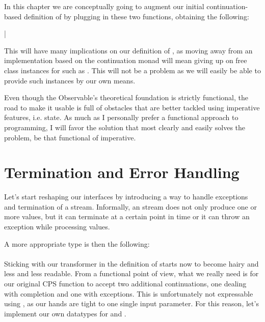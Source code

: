 In this chapter we are conceptually going to augment our initial continuation-based definition of  by plugging in these two functions, obtaining the following:

\hmint |%

This will have many implications on our definition of , as moving away from an implementation based on the continuation monad will mean giving up on free class instances for  such as . This will not be a problem as we will easily be able to provide such instances by our own means. 

Even though the Observable's theoretical foundation is strictly functional, the road to make it usable is full of obstacles that are better tackled using imperative features, i.e. state. As much as I personally prefer a functional approach to programming, I will favor the solution that most clearly and easily solves the problem, be that functional of imperative.

\section{Termination and Error Handling}

Let's start reshaping our interfaces by introducing a way to handle exceptions and termination of a stream. Informally, an  stream does not only produce one or more values, but it can terminate at a certain point in time or it can throw an exception while processing values.

A more appropriate type is then the following:\\

\\

Sticking with our  transformer in the definition of  starts now to become hairy and less and less readable. From a functional point of view, what we really need is for our original CPS function to accept two additional continuations, one dealing with completion and one with exceptions. This is unfortunately not expressable using , as our hands are tight to one single input parameter. For this reason, let's implement our own datatypes for  and .\\

\\

